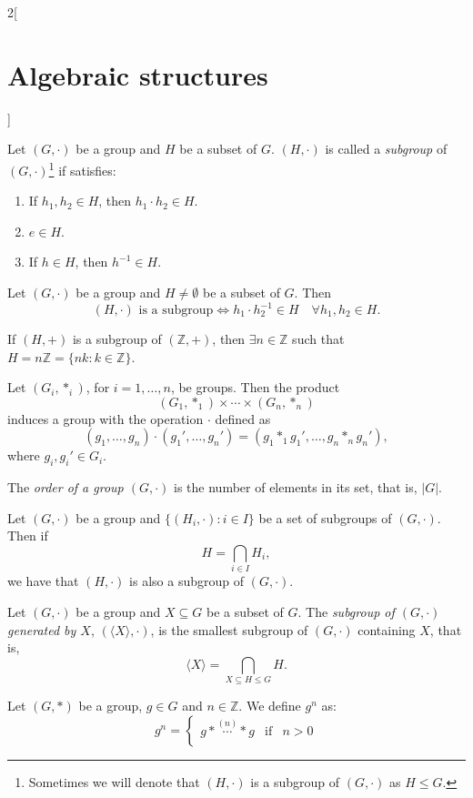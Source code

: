 \documentclass[class=article,10pt,crop=false]{standalone}
\begin{document}
\begin{multicols}{2}[\section{Algebraic structures}]
\begin{definition}[Subgroup]
Let $(G,\cdot)$ be a group and $H$ be a subset of $G$. $(H,\cdot)$ is called a \textit{subgroup} of $(G,\cdot)$\footnote{Sometimes we will denote that $(H,\cdot)$ is a subgroup of $(G,\cdot)$ as $H\leq G$.} if satisfies:
\begin{enumerate}
    \item If $h_1,h_2\in H$, then $h_1\cdot h_2\in H$.
    \item $e\in H$.
    \item If $h\in H$, then $h^{-1}\in H$.
\end{enumerate}
\end{definition}
\begin{prop}
Let $(G,\cdot)$ be a group and $H\ne\emptyset$ be a subset of $G$. Then $$(H,\cdot)\text{ is a subgroup}\iff h_1\cdot h_2^{-1}\in H\quad\forall h_1,h_2\in H.$$
\end{prop}
\begin{prop}
If $(H,+)$ is a subgroup of $(\mathbb{Z},+)$, then $\exists n\in\mathbb{Z}$ such that $H=n\mathbb{Z}=\{nk:k\in\mathbb{Z}\}$.
\end{prop}
\begin{prop}
Let $(G_i,*_i)$, for $i=1,\ldots, n$, be groups. Then the product $$(G_1,*_1)\times\cdots\times(G_n,*_n)$$ induces a group with the operation $\cdot$ defined as $$(g_1,\ldots,g_n)\cdot(g_1',\ldots,g_n')=(g_1*_1g_1',\ldots,g_n*_ng_n'),$$ where $g_i,g_i'\in G_i$.
\end{prop}
\begin{definition}
The \textit{order of a group $(G,\cdot)$} is the number of elements in its set, that is, $|G|$.
\end{definition}
\begin{lemma}
Let $(G,\cdot)$ be a group and $\{(H_i,\cdot):i\in I\}$ be a set of subgroups of $(G,\cdot)$. Then if $$H=\displaystyle\bigcap_{i\in I}H_i,$$ we have that $(H,\cdot)$ is also a subgroup of $(G,\cdot)$.
\end{lemma}
\begin{definition}
Let $(G,\cdot)$ be a group and $X\subseteq G$ be a subset of $G$. The \textit{subgroup of $(G,\cdot)$ generated by $X$}, $(\langle X\rangle,\cdot)$, is the smallest subgroup of $(G,\cdot)$ containing $X$, that is, $$\langle X\rangle=\bigcap_{X\subseteq H\leq G}H.$$
\end{definition}
\begin{definition}
Let $(G,*)$ be a group, $g\in G$ and $n\in\mathbb{Z}$. We define $g^n$ as: $$g^n=\left\{\begin{array}{lll}
    g*\overset{(n)}{\cdots}* g & \text{if} & n>0  \\

\end{array}$$
\end{definition}
\end{multicols}
\end{document}
